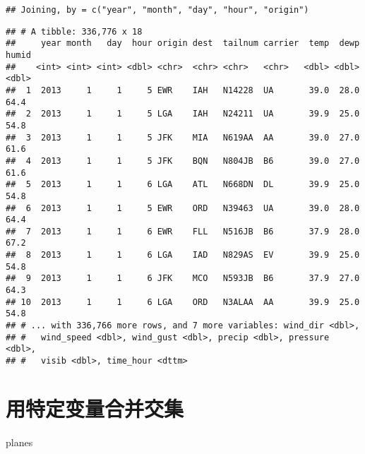 \documentclass[
]{article}
\newenvironment{Shaded}{\begin{snugshade}}{\end{snugshade}}
\newcommand{\KeywordTok}[1]{\textcolor[rgb]{0.13,0.29,0.53}{\textbf{#1}}}
\newcommand{\NormalTok}[1]{#1}
\newcommand{\OperatorTok}[1]{\textcolor[rgb]{0.81,0.36,0.00}{\textbf{#1}}}
\newcommand{\StringTok}[1]{\textcolor[rgb]{0.31,0.60,0.02}{#1}}
\begin{document}
\begin{Shaded}
\end{Shaded}

\begin{verbatim}
## Joining, by = c("year", "month", "day", "hour", "origin")
\end{verbatim}

\begin{verbatim}
## # A tibble: 336,776 x 18
##     year month   day  hour origin dest  tailnum carrier  temp  dewp humid
##    <int> <int> <int> <dbl> <chr>  <chr> <chr>   <chr>   <dbl> <dbl> <dbl>
##  1  2013     1     1     5 EWR    IAH   N14228  UA       39.0  28.0  64.4
##  2  2013     1     1     5 LGA    IAH   N24211  UA       39.9  25.0  54.8
##  3  2013     1     1     5 JFK    MIA   N619AA  AA       39.0  27.0  61.6
##  4  2013     1     1     5 JFK    BQN   N804JB  B6       39.0  27.0  61.6
##  5  2013     1     1     6 LGA    ATL   N668DN  DL       39.9  25.0  54.8
##  6  2013     1     1     5 EWR    ORD   N39463  UA       39.0  28.0  64.4
##  7  2013     1     1     6 EWR    FLL   N516JB  B6       37.9  28.0  67.2
##  8  2013     1     1     6 LGA    IAD   N829AS  EV       39.9  25.0  54.8
##  9  2013     1     1     6 JFK    MCO   N593JB  B6       37.9  27.0  64.3
## 10  2013     1     1     6 LGA    ORD   N3ALAA  AA       39.9  25.0  54.8
## # ... with 336,766 more rows, and 7 more variables: wind_dir <dbl>,
## #   wind_speed <dbl>, wind_gust <dbl>, precip <dbl>, pressure <dbl>,
## #   visib <dbl>, time_hour <dttm>
\end{verbatim}

\hypertarget{ux7528ux7279ux5b9aux53d8ux91cfux5408ux5e76ux4ea4ux96c6}{%
\section{用特定变量合并交集}\label{ux7528ux7279ux5b9aux53d8ux91cfux5408ux5e76ux4ea4ux96c6}}

\begin{Shaded}
\begin{Highlighting}[]
\NormalTok{planes}
\end{Highlighting}
\end{Shaded}
\end{document}
